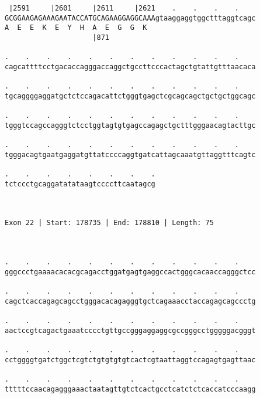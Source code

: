 \documentclass{article}
\begin{document}
\begin{Verbatim}
 |2591     |2601     |2611     |2621    .    .    .    .    
GCGGAAGAGAAAGAATACCATGCAGAAGGAGGCAAAgtaaggaggtggctttaggtcagc
A  E  E  K  E  Y  H  A  E  G  G  K                          
                     |871                                   
  
.    .    .    .    .    .    .    .    .    .    .    .    
cagcattttcctgacaccagggaccaggctgccttcccactagctgtattgtttaacaca
                                                            
.    .    .    .    .    .    .    .    .    .    .    .    
tgcaggggaggatgctctccagacattctgggtgagctcgcagcagctgctgctggcagc
                                                            
.    .    .    .    .    .    .    .    .    .    .    .    
tgggtccagccagggtctcctggtagtgtgagccagagctgctttgggaacagtacttgc
                                                            
.    .    .    .    .    .    .    .    .    .    .    .    
tgggacagtgaatgaggatgttatccccaggtgatcattagcaaatgttaggtttcagtc
                                                            
.    .    .    .    .    .    .    .
tctccctgcaggatatataagtccccttcaatagcg
                                    
                                    
 
Exon 22 | Start: 178735 | End: 178810 | Length: 75



.    .    .    .    .    .    .    .    .    .    .    .    
gggccctgaaaacacacgcagacctggatgagtgaggccactgggcacaaccagggctcc
                                                            
.    .    .    .    .    .    .    .    .    .    .    .    
cagctcaccagagcagcctgggacacagagggtgctcagaaacctaccagagcagccctg
                                                            
.    .    .    .    .    .    .    .    .    .    .    .    
aactccgtcagactgaaatcccctgttgccgggaggaggcgccgggcctgggggacgggt
                                                            
.    .    .    .    .    .    .    .    .    .    .    .    
cctggggtgatctggctcgtctgtgtgtgtcactcgtaattaggtccagagtgagttaac
                                                            
.    .    .    .    .    .    .    .    .    .    .    .    
tttttccaacagagggaaactaatagttgtctcactgcctcatctctcaccatcccaagg
                                                            

\end{Verbatim}
\end{document}
